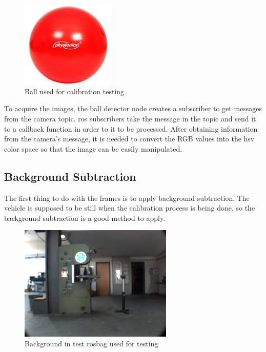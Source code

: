 \begin{figure}[htp]
	
	\centering
	\includegraphics[width=0.4\textwidth]{capcalib/imgs/ball.png}
	
	\caption{Ball used for calibration testing}
	\label{fig:ball}
	
\end{figure}

To acquire the images, the ball detector node creates a subscriber to get messages from the camera topic. \gls{ros} subscribers take the message in the topic and send it to a callback function in order to it to be processed. After obtaining information from the camera's message, it is needed to convert the RGB values into the \gls{hsv} color space so that the image can be easily manipulated.

\subsection{Background Subtraction}

The first thing to do with the frames is to apply background subtraction. The vehicle is supposed to be still when the calibration process is being done, so the background subtraction is a good method to apply.

\begin{figure}[h!]
	
	\centering
	\includegraphics[width=0.65\textwidth]{capcalib/imgs/background.png}
	
	\caption{Background in test rosbag used for testing}
	\label{fig:background}
	
\end{figure}

